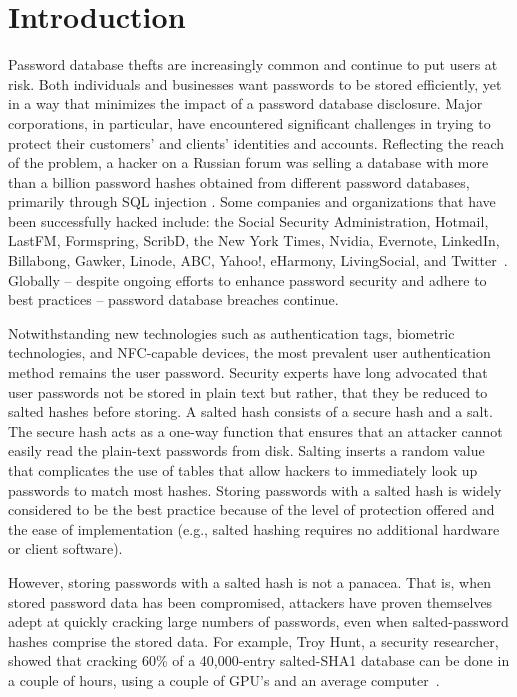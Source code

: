 \section{Introduction}
\label{SEC:introduction}

Password database thefts are increasingly common and continue to put users at
risk. Both individuals and businesses want passwords to be stored efficiently,
yet in a way that minimizes the impact of a password database disclosure. Major
corporations, in particular, have encountered significant challenges in trying
to protect their customers' and clients' identities and accounts. Reflecting
the reach of the problem, a hacker on a Russian forum was selling a database
with more than a billion password hashes obtained from different password
databases, primarily through SQL injection \cite{miranteTR13}. Some companies
and organizations that have been successfully hacked include: the Social
Security Administration, Hotmail, LastFM, Formspring, ScribD, the New York
Times, Nvidia, Evernote, LinkedIn, Billabong, Gawker, Linode, ABC, Yahoo!,
eHarmony, LivingSocial, and Twitter~\cite{miranteTR13}. Globally -- despite
ongoing efforts to enhance password security and adhere to best practices --
password database breaches continue. 

Notwithstanding new technologies such as authentication tags, biometric
technologies, and NFC-capable devices, the most prevalent user authentication
method remains the user password. Security experts have long advocated that
user passwords not be stored in plain text but rather, that they be reduced to
salted hashes before storing.  A salted hash consists of a secure hash and a
salt.  The secure hash acts as a one-way function that ensures that an attacker
cannot easily read the plain-text passwords from disk. Salting inserts a random
value that complicates the use of tables that allow hackers to immediately look
up passwords to match most hashes.  Storing passwords with a salted hash is
widely considered to be the best practice because of the level of protection
offered and the ease of implementation (e.g., salted hashing requires no
additional hardware or client software).

However, storing passwords with a salted hash is not a panacea.  That is, when
stored password data has been compromised, attackers have proven themselves adept at
quickly cracking large numbers of passwords, even when salted-password hashes
comprise the stored data. For example, Troy Hunt, a security researcher, showed
that cracking 60\% of a 40,000-entry salted-SHA1 database can be done in a
couple of hours, using a couple of GPU’s and an average computer~\cite{thunt-hashing}. 

